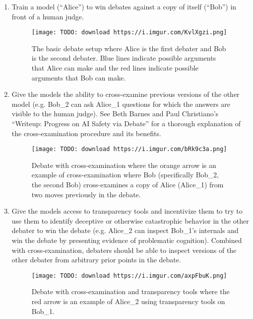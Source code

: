 \documentclass[
  onecolumn,
  natbib,
]{miri-tech-article}
\begin{document}
\begin{enumerate}
\item Train a model (``Alice'') to win debates against a copy of itself (``Bob'') in front of a human judge.

\begin{figure}[h!]
  \centering
  \texttt{[image: TODO: download https://i.imgur.com/KvlXgzi.png]}
  \caption{The basic debate setup where Alice is the first debater and Bob is the second debater. Blue lines indicate possible arguments that Alice can make and the red lines indicate possible arguments that Bob can make.}
\end{figure}

\item Give the models the ability to cross-examine previous versions of the other model (e.g. Bob_2 can ask Alice_1 questions for which the answers are visible to the human judge). See Beth Barnes and Paul Christiano's ``Writeup: Progress on AI Safety via Debate\cite{TODO: cite https://www.alignmentforum.org/posts/Br4xDbYu4Frwrb64a/writeup-progress-on-ai-safety-via-debate-1}'' for a thorough explanation of the cross-examination procedure and its benefits.

\begin{figure}[h!]
  \centering
  \texttt{[image: TODO: download https://i.imgur.com/bRk9c3a.png]}
  \caption{Debate with cross-examination where the orange arrow is an example of cross-examination where Bob (specifically Bob_2, the second Bob) cross-examines a copy of Alice (Alice_1) from two moves previously in the debate.}
\end{figure}

\item Give the models access to transparency tools and incentivize them to try to use them to identify deceptive\cite{TODO: cite https://www.alignmentforum.org/posts/zthDPAjh9w6Ytbeks/deceptive-alignment} or otherwise catastrophic\cite{TODO: cite https://ai-alignment.com/learning-with-catastrophes-59387b55cc30} behavior in the other debater to win the debate (e.g. Alice_2 can inspect Bob_1's internals and win the debate by presenting evidence of problematic cognition). Combined with cross-examination, debaters should be able to inspect versions of the other debater from arbitrary prior points in the debate.

\begin{figure}[h!]
  \centering
  \texttt{[image: TODO: download https://i.imgur.com/axpFbuK.png]}
  \caption{Debate with cross-examination and transparency tools where the red arrow is an example of Alice_2 using transparency tools on Bob_1.}
\end{figure}
\end{enumerate}
\end{document}
